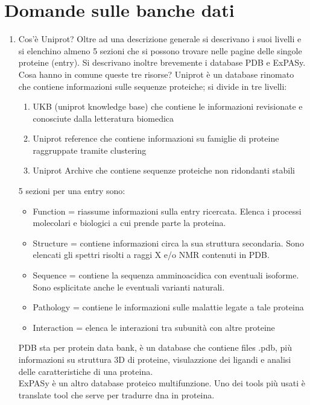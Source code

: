 \documentclass{article}
\begin{document}
\section{Domande sulle banche dati}
\begin{enumerate}
    \item Cos'è Uniprot? Oltre ad una descrizione generale si descrivano i suoi livelli e si elenchino almeno 5 sezioni che si possono trovare nelle pagine delle singole proteine (entry). Si descrivano inoltre brevemente i database PDB e ExPASy. Cosa hanno in comune queste tre risorse?
      \subitem{-} Uniprot è un database rinomato che contiene informazioni sulle sequenze proteiche; si divide in tre livelli: 
         \begin{enumerate}
            \item UKB (uniprot knowledge base) che contiene le informazioni revisionate e conosciute dalla letteratura biomedica
            \item Uniprot reference che contiene informazioni su famiglie di proteine raggruppate tramite clustering
            \item Uniprot Archive che contiene sequenze proteiche non ridondanti stabili
         \end{enumerate}
      5 sezioni per una entry sono:
      \begin{itemize}
         \item Function = riassume informazioni sulla entry ricercata. Elenca i processi molecolari e biologici a cui prende parte la proteina.
         \item Structure =  contiene informazioni circa la sua struttura secondaria. Sono elencati gli spettri risolti a raggi X e/o NMR contenuti in PDB.
         \item Sequence = contiene la sequenza amminoacidica con eventuali isoforme. Sono esplicitate anche le eventuali varianti naturali.
         \item Pathology = contiene le informazioni sulle malattie legate a tale proteina
         \item Interaction = elenca le interazioni tra subunità con altre proteine
      \end{itemize}
      PDB sta per protein data bank, è un database che contiene files .pdb, più informazioni su struttura 3D di proteine, visulazzione dei ligandi e analisi delle caratteristiche di una proteina.\\
      ExPASy è un altro database proteico multifunzione. Uno dei tools più usati è translate tool che serve per tradurre dna in proteina.\\

\end{enumerate}
\end{document}
